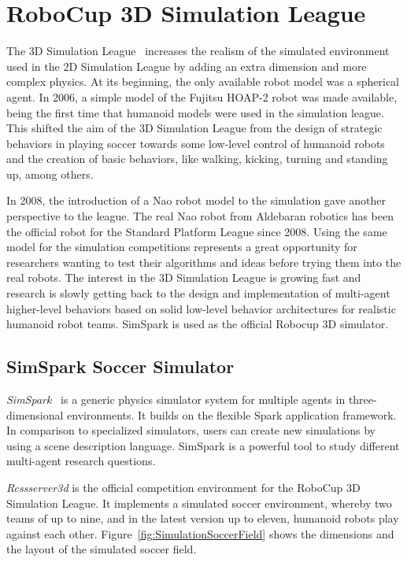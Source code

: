 \chapter{RoboCup 3D Simulation League}
\label{Soccer Simulation League 3D}

The 3D Simulation League~\cite{SoccerSimulationLeague3D} increases the realism of the simulated environment used in the 2D Simulation League by adding an extra dimension and more complex physics. At its beginning, the only available robot model was a spherical agent. In 2006, a simple model of the Fujitsu HOAP-2 robot was made available, being the first time that humanoid models were used in the simulation league. This shifted the aim of the 3D Simulation League from the design of strategic behaviors in playing soccer towards some low-level control of humanoid robots and the creation of basic behaviors, like walking, kicking, turning and standing up, among others.

In 2008, the introduction of a Nao robot model to the simulation gave another perspective to the league. The real Nao robot from Aldebaran robotics has been the official robot for the Standard Platform League since 2008. Using the same model for the simulation competitions represents a great opportunity for researchers wanting to test their algorithms and ideas before trying them into the real robots. The interest in the 3D Simulation League is growing fast and research is slowly getting back to the design and implementation of multi-agent higher-level behaviors based on solid low-level behavior architectures for realistic humanoid robot teams. SimSpark is used as the official Robocup 3D simulator.

\section{SimSpark Soccer Simulator}
\textit{SimSpark}~\cite{SimSpark} is a generic physics simulator system for multiple agents in three-dimensional environments. It builds on the flexible Spark application framework. In comparison to specialized simulators, users can create new simulations by using a scene description language. SimSpark is a powerful tool to study different multi-agent research questions. 

\textit{Rcssserver3d} is the official competition environment for the RoboCup 3D Simulation League. It implements a simulated soccer environment, whereby two teams of up to nine, and in the latest version up to eleven, humanoid robots play against each other. Figure~\ref{fig:SimulationSoccerField} shows the dimensions and the layout of the simulated soccer field.

